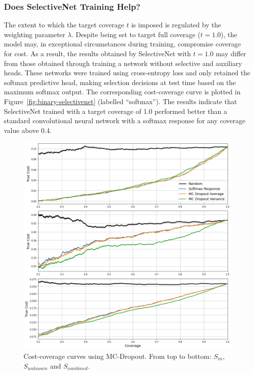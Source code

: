 \subsubsection{Does SelectiveNet Training Help?}
The extent to which the target coverage $t$ is imposed is regulated by the weighting parameter $\lambda$. Despite being set to target full coverage ($t=1.0$), the model may, in exceptional circumstances during training, compromise coverage for cost. As a result, the results obtained by SelectiveNet with $t=1.0$ may differ from those obtained through training a network without selective and auxiliary heads. These networks were trained using cross-entropy loss and only retained the softmax predictive head, making selection decisions at test time based on the maximum softmax output. The corresponding cost-coverage curve is plotted in Figure~\ref{fig:binary-selectivenet} (labelled “softmax”). The results indicate that SelectiveNet trained with a target coverage of 1.0 performed better than a standard convolutional neural network with a softmax response for any coverage value above $0.4$.

\begin{figure}[!h]
	\centering
	\includegraphics[width=\textwidth]{images/binary_mcdropout.png}
	\caption{Cost-coverage curves using MC-Dropout. From top to bottom: $S_{in}$, $S_{unknown}$ and $S_{combined}$.}
	\label{fig:binary-mcdropout}
\end{figure}

